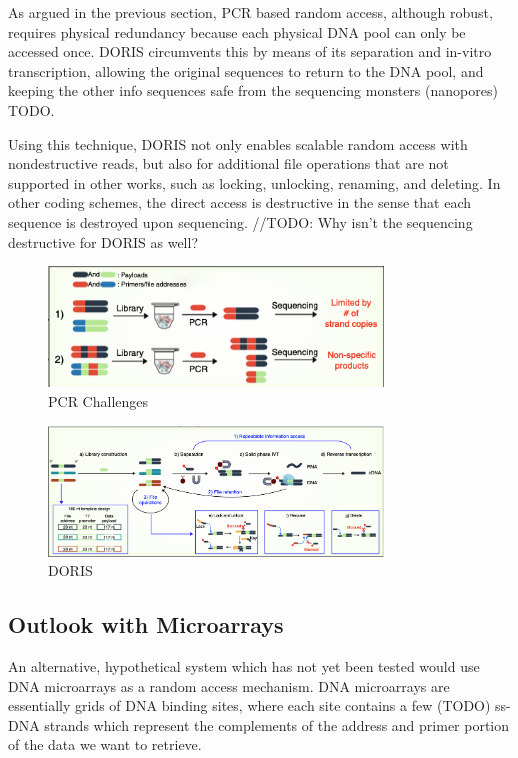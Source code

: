 \documentclass[a4paper,conference]{IEEEtran}
\begin{document}
As argued in the previous section, PCR based random access, although robust, requires physical redundancy because each physical DNA pool can only be accessed once. DORIS circumvents this by means of its separation and in-vitro transcription, allowing the original sequences to return to the DNA pool, and keeping the other info sequences safe from the sequencing monsters (nanopores) TODO.

Using this technique, DORIS not only enables scalable random access with nondestructive reads, but also for additional file operations that are not supported in other works, such as locking, unlocking, renaming, and deleting. In other coding schemes, the direct access is destructive in the sense that each sequence is destroyed upon sequencing. //TODO: Why isn't the sequencing destructive for DORIS as well?


\begin{figure}[!t]
\centering
\includegraphics[width=3.5in]{pcrchallenges}
\caption{PCR Challenges}
\label{pcr_challenges}
\end{figure}

\begin{figure}[!t]
\centering
\includegraphics[width=3.5in]{doris}
\caption{DORIS}
\label{doris}
\end{figure}

\subsection{Outlook with Microarrays}
An alternative, hypothetical system which has not yet been tested would use DNA microarrays as a random access mechanism. DNA microarrays are essentially grids of DNA binding sites, where each site contains a few (TODO) ss-DNA strands which represent the complements of the address and primer portion of the data we want to retrieve. 
\end{document}
